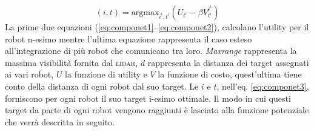 \begin{equation}
\label{eq:componet3}
(i,t) = \text{argmax}_{i^{\iota},t^{\iota}} (U_{t^{\iota}}  -\beta V^{i^{\iota}}_{t^{\iota}} )
\end{equation}
%
La prime due equazioni (\ref{eq:componet1}--\ref{eq:componet2}), calcolano
l'utility per il robot n-esimo mentre l'ultima equazione rappresenta il caso
esteso all'integrazione di più robot che comunicano tra loro.
\emph{Maxrange} rappresenta la massima visibilità fornita dal \textsc{lidar},
$d$ rappresenta la distanza dei target assegnati ai vari robot, $U$ la funzione
di utility e $V$ la funzione di costo, quest'ultima tiene conto della distanza
di ogni robot dal suo target. 
Le $i$ e $t$, nell'eq. \eqref{eq:componet3}, forniscono per ogni robot il suo
target i-esimo ottimale.
Il modo in cui questi target da parte di ogni robot vengono raggiunti è
lasciato alla funzione potenziale che verrà descritta in seguito.
